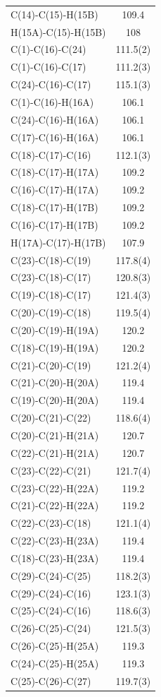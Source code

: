 \begin{center}
{\begin{supertabular}{p{1.5in}c}
C(14)-C(15)-H(15B)&109.4\\
H(15A)-C(15)-H(15B)&108\\
C(1)-C(16)-C(24)&111.5(2)\\
C(1)-C(16)-C(17)&111.2(3)\\
C(24)-C(16)-C(17)&115.1(3)\\
C(1)-C(16)-H(16A)&106.1\\
C(24)-C(16)-H(16A)&106.1\\
C(17)-C(16)-H(16A)&106.1\\
C(18)-C(17)-C(16)&112.1(3)\\
C(18)-C(17)-H(17A)&109.2\\
C(16)-C(17)-H(17A)&109.2\\
C(18)-C(17)-H(17B)&109.2\\
C(16)-C(17)-H(17B)&109.2\\
H(17A)-C(17)-H(17B)&107.9\\
C(23)-C(18)-C(19)&117.8(4)\\
C(23)-C(18)-C(17)&120.8(3)\\
C(19)-C(18)-C(17)&121.4(3)\\
C(20)-C(19)-C(18)&119.5(4)\\
C(20)-C(19)-H(19A)&120.2\\
C(18)-C(19)-H(19A)&120.2\\
C(21)-C(20)-C(19)&121.2(4)\\
C(21)-C(20)-H(20A)&119.4\\
C(19)-C(20)-H(20A)&119.4\\
C(20)-C(21)-C(22)&118.6(4)\\
C(20)-C(21)-H(21A)&120.7\\
C(22)-C(21)-H(21A)&120.7\\
C(23)-C(22)-C(21)&121.7(4)\\
C(23)-C(22)-H(22A)&119.2\\
C(21)-C(22)-H(22A)&119.2\\
C(22)-C(23)-C(18)&121.1(4)\\
C(22)-C(23)-H(23A)&119.4\\
C(18)-C(23)-H(23A)&119.4\\
C(29)-C(24)-C(25)&118.2(3)\\
C(29)-C(24)-C(16)&123.1(3)\\
C(25)-C(24)-C(16)&118.6(3)\\
C(26)-C(25)-C(24)&121.5(3)\\
C(26)-C(25)-H(25A)&119.3\\
C(24)-C(25)-H(25A)&119.3\\
C(25)-C(26)-C(27)&119.7(3)\\

\end{supertabular}}
\end{center}

